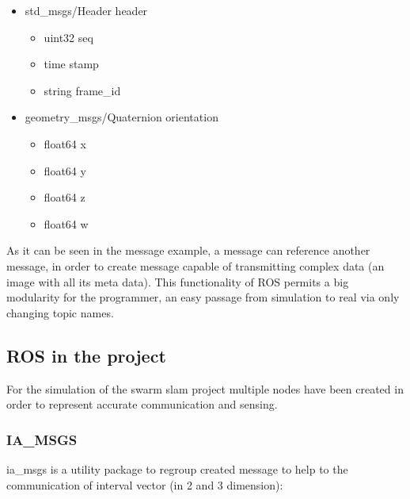 \begin{minipage}[b]{0.8\textwidth}
\begin{itemize}[label={},itemsep=0cm,topsep=0cm]
\item std\_msgs/Header header
  \begin{itemize}[label={},itemsep=0cm,topsep=0cm]
  \item uint32 seq
  \item time stamp
  \item string frame\_id
   \end{itemize}
\item geometry\_msgs/Quaternion orientation
  \begin{itemize}[label={},itemsep=0cm,topsep=0cm]
  \item float64 x
  \item float64 y
  \item float64 z
  \item float64 w
  \end{itemize}
\end{itemize}
\end{minipage}


As it can be seen in the message example, a message can reference another message, in order to create message capable of transmitting complex data (an image with all its meta data).
This functionality of ROS permits a big modularity for the programmer, an easy passage from simulation to real via only changing topic names.

\subsection{ROS in the project}

For the simulation of the swarm slam project multiple nodes have been
created in order to represent accurate communication and sensing.

\subsubsection*{IA\_MSGS}

ia\_msgs is a utility package to regroup created message to help to the communication of interval vector (in 2 and 3 dimension):\\

